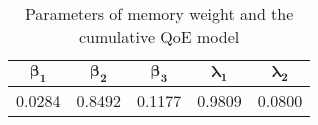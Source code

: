 \begin{table}[tb]
  \caption{Parameters of memory weight and the cumulative QoE model}
  \centering
  \begin{tabular}{|ccc|cc|}
    \hline
    $\bm{\beta_{1}}$ & $\bm{\beta_{2}}$ & $\bm{\beta_{3}}$ & $\bm{\lambda_{1}}$ & $\bm{\lambda_{2}}$\\
    \hline
    0.0284 & 0.8492 & 0.1177 & 0.9809 & 0.0800\\
    \hline
  \end{tabular}
  \label{tbl:Parameters_CumulativeQoE}
\end{table}
